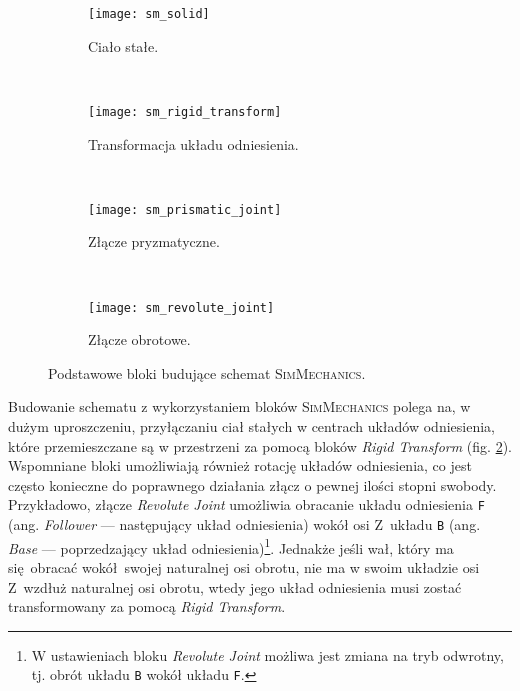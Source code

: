 \begin{figure}[h]
    \centering
    \begin{subfigure}[t]{0.15\textwidth}
        \centering
        \texttt{[image: sm\_solid]}
        \caption{Ciało stałe.}
        \label{fig:sm_solid}
    \end{subfigure}
    ~ 
    \begin{subfigure}[t]{0.15\textwidth}
        \centering
        \texttt{[image: sm\_rigid\_transform]}
        \caption{Transformacja układu odniesienia.}
        \label{fig:sm_rigid_transform}
    \end{subfigure}
    ~ 
    \begin{subfigure}[t]{0.15\textwidth}
        \centering
        \texttt{[image: sm\_prismatic\_joint]}
        \caption{Złącze pryzmatyczne.}
        \label{fig:sm_prismatic_joint}
    \end{subfigure}
    ~
    \begin{subfigure}[t]{0.15\textwidth}
        \centering
        \texttt{[image: sm\_revolute\_joint]}
        \caption{Złącze obrotowe.}
        \label{fig:sm_revolute_joint}
    \end{subfigure}
    
    \caption{Podstawowe bloki budujące schemat \textsc{SimMechanics}.}
    \label{fig:simmechanics_bloki}
\end{figure}

Budowanie schematu z wykorzystaniem bloków \textsc{SimMechanics} polega na, w dużym uproszczeniu, przyłączaniu ciał stałych w centrach układów odniesienia, które przemieszczane są w przestrzeni za pomocą bloków \textit{Rigid Transform} (fig. \ref{fig:sm_rigid_transform}). Wspomniane bloki umożliwiają również rotację układów odniesienia, co jest często konieczne do poprawnego działania złącz o pewnej ilości stopni swobody. Przykładowo, złącze \textit{Revolute Joint} umożliwia obracanie układu odniesienia \texttt{F} (ang. \textit{Follower} --- następujący układ odniesienia) wokół osi Z~układu \texttt{B} (ang. \textit{Base} --- poprzedzający układ odniesienia)\footnote{W ustawieniach bloku \textit{Revolute Joint} możliwa jest zmiana na tryb odwrotny, tj. obrót układu \texttt{B} wokół układu \texttt{F}.}. Jednakże jeśli wał, który ma się obracać wokół swojej naturalnej osi obrotu, nie ma w swoim układzie osi Z~wzdłuż naturalnej osi obrotu, wtedy jego układ odniesienia musi zostać transformowany za pomocą \textit{Rigid Transform}.

